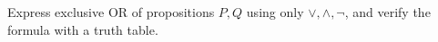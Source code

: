 Express exclusive OR of propositions $P,Q$ using only $\lor,\land,\neg$, and verify the formula with a truth table.
